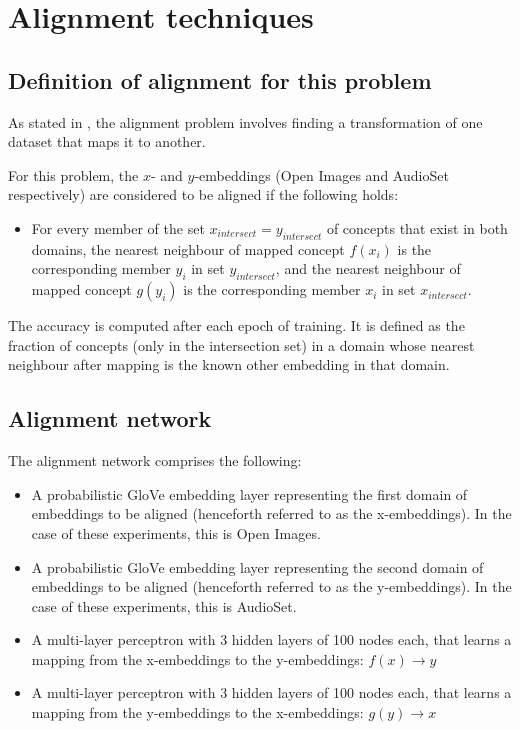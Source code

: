 \section{Alignment techniques}

\subsection{Definition of alignment for this problem}

As stated in \cite{ManifoldLearningTheoryAndApplications}, the alignment problem involves finding a transformation of one dataset that maps it to another. 

For this problem, the $x$- and $y$-embeddings (Open Images and AudioSet respectively) are considered to be aligned if the following holds:

\begin{itemize}
    \item For every member of the set $x_{intersect} = y_{intersect}$ of concepts that exist in both domains, the nearest neighbour of mapped concept $f(x_i)$ is the corresponding member $y_i$ in set $y_{intersect}$, and the nearest neighbour of mapped concept $g(y_i)$ is the corresponding member $x_i$ in set $x_{intersect}$. 
\end{itemize}

The accuracy is computed after each epoch of training. It is defined as the fraction of concepts (only in the intersection set) in a domain whose nearest neighbour after mapping is the known other embedding in that domain. 

\subsection{Alignment network}

The alignment network comprises the following:

\begin{itemize}
    \item A probabilistic GloVe embedding layer representing the first domain of embeddings to be aligned (henceforth referred to as the x-embeddings). In the case of these experiments, this is Open Images. 
    \item A probabilistic GloVe embedding layer representing the second domain of embeddings to be aligned (henceforth referred to as the y-embeddings). In the case of these experiments, this is AudioSet. 
    \item A multi-layer perceptron with 3 hidden layers of 100 nodes each, that learns a mapping from the x-embeddings to the y-embeddings: $f(x) \rightarrow y$
    \item A multi-layer perceptron with 3 hidden layers of 100 nodes each, that learns a mapping from the y-embeddings to the x-embeddings: $g(y) \rightarrow x$
\end{itemize}

